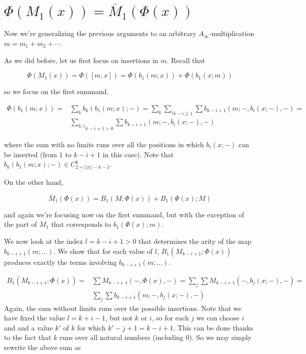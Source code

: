 \documentclass[twoside]{article}
\begin{document}

\section{$\Phi(M_1(x))=\overline{M}_1(\Phi(x))$}
Now we're generalizing the previous arguments to an arbitrary $A_\infty$-multiplication $m=m_1+m_2+\cdots$.

As we did before, let us first focus on insertions in $m$. Recall that 

$$\Phi(M_1(x))=\Phi([m,x])=\Phi(b_1(m;x))+\Phi(b_1(x;m))$$

so we focus on the first summand. 

\begin{align*}
\Phi(b_1(m;x))=&\sum_k b_k(b_1(m;x);-)=\sum_k \underset{k-i\geq 1}{\sum_i} \sum b_{k-i+1}(m;-, b_i(x;-),-)=\\
&\underset{k-i+1> 0}{\sum_{k,i}}\sum b_{k-i+1}(m;-, b_i(x;-),-)
\end{align*}

where the sum with no limits runs over all the positions in which $b_i(x;-)$ can be inserted (from $1$ to $k-i+1$ in this case). Note that $b_k(b_1(m;x);-)\in C^k_{2+||x||-k-1}$. 


On the other hand, 

$$\overline{M}_1(\Phi(x))=B_1(M;\Phi(x))+B_1(\Phi(x);M)$$

and again we're focusing now on the first summand, but with the exception of the part of $M_1$ that corresponds to $b_1(\Phi(x);m)$. 

We now look at the index $l=k-i+1> 0$ that determines the arity of the map $b_{k-i+1}(m;\dots)$. We show that for each value of $l$, $B_1(M_{k-i+1};\Phi(x))$ produces exactly the terms involving $b_{k-i+1}(m;\dots)$. 

\begin{align*}
B_1(M_{k-i+1};\Phi(x))=&\sum M_{k-i+1}(-,\Phi(x),-)=\sum_j\sum M_{k-i+1}(-,b_j(x;-),-)=\\
&\sum_j\sum b_{k-i+1}(m;-,b_j(x;-),-)
\end{align*}
Again, the sum without limits runs over the possible insertions. Note that we have fixed the value $l=k+i-1$, but not $k$ or $i$, so for each $j$ we can choose $i$ and and a value $k'$ of $k$ for which $k'-j+1=k-i+1$. This can be done thanks to the fact that $k$ runs over all natural numbers (including 0). So we may simply rewrite the above sum as
\end{document}
